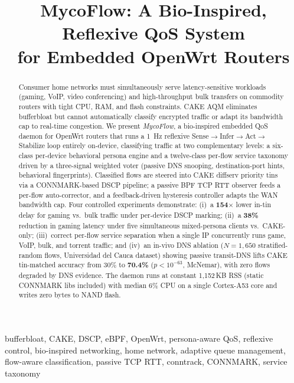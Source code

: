 \documentclass[conference]{IEEEtran}
\title{MycoFlow: A Bio-Inspired, Reflexive QoS System\\
       for Embedded OpenWrt Routers}
\author{
  \IEEEauthorblockN{Bar\i{}s Can Atakl\i{}}
  \IEEEauthorblockA{Department of Software Engineering\\
    Mu\u{g}la S\i{}tk\i{} Ko\c{c}man University\\
    Mu\u{g}la, Turkey\\
    bariscanatakli@posta.mu.edu.tr}
  \and
  \IEEEauthorblockN{Dr.\ \"{O}\u{g}r.\ \"{U}yesi Cihat \c{C}etinkaya}
  \IEEEauthorblockA{Department of Software Engineering\\
    Mu\u{g}la S\i{}tk\i{} Ko\c{c}man University\\
    Mu\u{g}la, Turkey}
}
\begin{document}
\maketitle

\begin{abstract}
Consumer home networks must simultaneously serve latency-sensitive workloads
(gaming, VoIP, video conferencing) and high-throughput bulk transfers on
commodity routers with tight CPU, RAM, and flash constraints.
CAKE AQM eliminates bufferbloat but cannot automatically classify encrypted
traffic or adapt its bandwidth cap to real-time congestion.
We present \emph{MycoFlow}, a bio-inspired embedded QoS daemon for OpenWrt
routers that runs a 1~Hz reflexive Sense$\to$Infer$\to$Act$\to$Stabilize
loop entirely on-device, classifying traffic at two complementary levels:
a six-class per-device behavioral persona engine and a twelve-class per-flow
service taxonomy driven by a three-signal weighted voter (passive DNS snooping,
destination-port hints, behavioral fingerprints).
Classified flows are steered into CAKE diffserv priority tins via a
CONNMARK-based DSCP pipeline; a passive BPF TCP RTT observer feeds a
per-flow auto-corrector, and a feedback-driven hysteresis controller adapts
the WAN bandwidth cap.
Four controlled experiments demonstrate:
(i)~a \textbf{154$\times$} lower in-tin delay for gaming vs.\ bulk traffic
under per-device DSCP marking;
(ii)~a \textbf{38\%} reduction in gaming latency under five simultaneous
mixed-persona clients vs.\ CAKE-only;
(iii)~correct per-flow service separation when a single IP concurrently runs
game, VoIP, bulk, and torrent traffic; and
(iv)~an in-vivo DNS ablation ($N=1{,}650$ stratified-random flows,
Universidad del Cauca dataset) showing passive transit-DNS lifts CAKE
tin-matched accuracy from 30\% to \textbf{70.4\%} ($p<10^{-63}$, McNemar),
with zero flows degraded by DNS evidence.
The daemon runs at constant 1{,}152\,KB RSS (static CONNMARK libs included)
with median 6\% CPU on a single Cortex-A53 core and writes zero bytes to
NAND flash.
\end{abstract}

\begin{IEEEkeywords}
bufferbloat, CAKE, DSCP, eBPF, OpenWrt, persona-aware QoS, reflexive control,
bio-inspired networking, home network, adaptive queue management,
flow-aware classification, passive TCP RTT, conntrack, CONNMARK, service
taxonomy
\end{IEEEkeywords}
\end{document}
